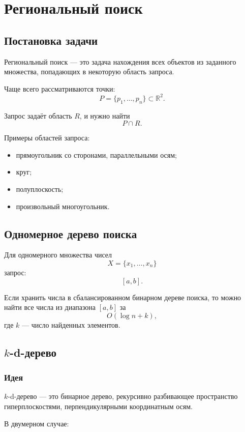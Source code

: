 \documentclass[12pt,a4paper]{article}
\begin{document}
\section{Региональный поиск}

\subsection{Постановка задачи}

Региональный поиск — это задача нахождения всех объектов из заданного множества, попадающих в некоторую область запроса.

Чаще всего рассматриваются точки:
\[
P=\{p_1,\dots,p_n\}\subset\mathbb{R}^2.
\]

Запрос задаёт область \(R\), и нужно найти
\[
P\cap R.
\]

Примеры областей запроса:

\begin{itemize}
    \item прямоугольник со сторонами, параллельными осям;
    \item круг;
    \item полуплоскость;
    \item произвольный многоугольник.
\end{itemize}

\subsection{Одномерное дерево поиска}

Для одномерного множества чисел
\[
X=\{x_1,\dots,x_n\}
\]
запрос:
\[
[a,b].
\]

Если хранить числа в сбалансированном бинарном дереве поиска, то можно найти все числа из диапазона \([a,b]\) за
\[
O(\log n+k),
\]
где \(k\) — число найденных элементов.

\subsection{\texorpdfstring{\(k\)-d}{kd}-дерево}

\subsubsection{Идея}

\(k\)-d-дерево — это бинарное дерево, рекурсивно разбивающее пространство гиперплоскостями, перпендикулярными координатным осям.

В двумерном случае:
\end{document}
